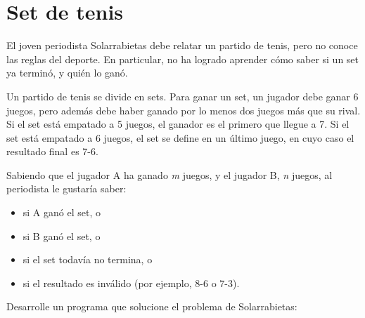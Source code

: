 \section{Set de tenis}

El joven periodista Solarrabietas debe relatar un partido de tenis, pero
no conoce las reglas del deporte. En particular, no ha logrado aprender
cómo saber si un set ya terminó, y quién lo ganó.

Un partido de tenis se divide en sets. Para ganar un set, un jugador
debe ganar 6 juegos, pero además debe haber ganado por lo menos dos
juegos más que su rival. Si el set está empatado a 5 juegos, el ganador
es el primero que llegue a 7. Si el set está empatado a 6 juegos, el set
se define en un último juego, en cuyo caso el resultado final es 7-6.

Sabiendo que el jugador A ha ganado \emph{m} juegos, y el jugador B,
\emph{n} juegos, al periodista le gustaría saber:

\begin{itemize}
\item
  si A ganó el set, o
\item
  si B ganó el set, o
\item
  si el set todavía no termina, o
\item
  si el resultado es inválido (por ejemplo, 8-6 o 7-3).
\end{itemize}

Desarrolle un programa que solucione el problema de Solarrabietas:
